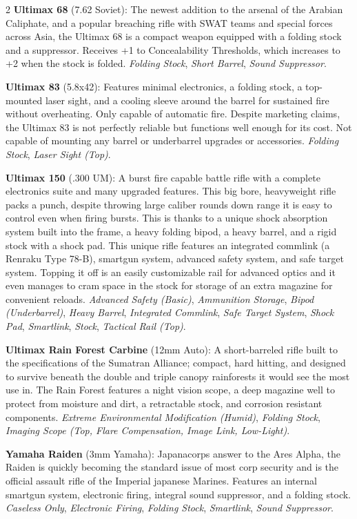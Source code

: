 \documentclass[
  oneside]{article}
\begin{document}
\begin{multicols}{2}
\textbf{Ultimax 68} (7.62 Soviet): The newest
addition to the arsenal of the Arabian Caliphate,
and a popular breaching rifle with SWAT teams and
special forces across Asia, the Ultimax 68 is a
compact weapon equipped with a folding stock and a
suppressor. Receives +1 to Concealability
Thresholds, which increases to +2 when the stock
is folded. \emph{Folding Stock}, \emph{Short
Barrel}, \emph{Sound Suppressor}.

\textbf{Ultimax 83} (5.8x42): Features minimal
electronics, a folding stock, a top-mounted laser
sight, and a cooling sleeve around the barrel for
sustained fire without overheating. Only capable
of automatic fire. Despite marketing claims, the
Ultimax 83 is not perfectly reliable but functions
well enough for its cost. Not capable of mounting
any barrel or underbarrel upgrades or accessories.
\emph{Folding Stock}, \emph{Laser Sight (Top)}.

\textbf{Ultimax 150} (.300 UM): A burst fire
capable battle rifle with a complete electronics
suite and many upgraded features. This big bore,
heavyweight rifle packs a punch, despite throwing
large caliber rounds down range it is easy to
control even when firing bursts. This is thanks to
a unique shock absorption system built into the
frame, a heavy folding bipod, a heavy barrel, and
a rigid stock with a shock pad. This unique rifle
features an integrated commlink (a Renraku Type
78-B), smartgun system, advanced safety system,
and safe target system. Topping it off is an
easily customizable rail for advanced optics and
it even manages to cram space in the stock for
storage of an extra magazine for convenient
reloads. \emph{Advanced Safety (Basic)},
\emph{Ammunition Storage}, \emph{Bipod
(Underbarrel)}, \emph{Heavy Barrel},
\emph{Integrated Commlink}, \emph{Safe Target
System}, \emph{Shock Pad}, \emph{Smartlink},
\emph{Stock}, \emph{Tactical Rail (Top)}.

\textbf{Ultimax Rain Forest Carbine} (12mm Auto):
A short-barreled rifle built to the specifications
of the Sumatran Alliance; compact, hard hitting,
and designed to survive beneath the double and
triple canopy rainforests it would see the most
use in. The Rain Forest features a night vision
scope, a deep magazine well to protect from
moisture and dirt, a retractable stock, and
corrosion resistant components. \emph{Extreme
Environmental Modification (Humid)}, \emph{Folding
Stock}, \emph{Imaging Scope (Top, Flare
Compensation, Image Link, Low-Light)}.

\textbf{Yamaha Raiden} (3mm Yamaha): Japanacorps
answer to the Ares Alpha, the Raiden is quickly
becoming the standard issue of most corp security
and is the official assault rifle of the Imperial
japanese Marines. Features an internal smartgun
system, electronic firing, integral sound
suppressor, and a folding stock. \emph{Caseless
Only}, \emph{Electronic Firing}, \emph{Folding
Stock}, \emph{Smartlink}, \emph{Sound Suppressor}.


\end{multicols}
\end{document}
